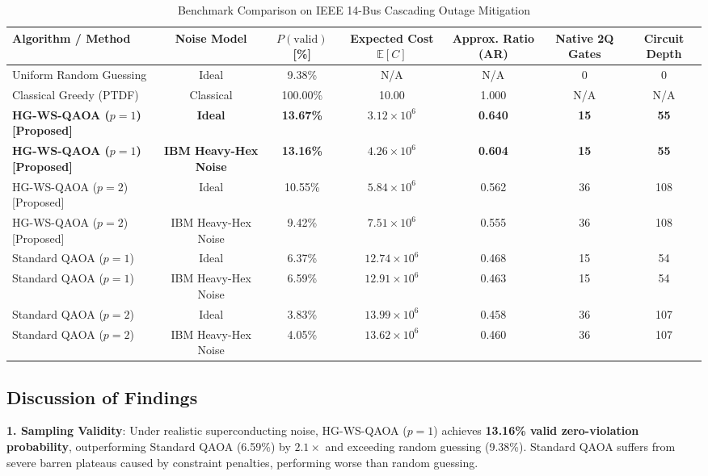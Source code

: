 \documentclass[conference]{IEEEtran}
\begin{document}
\begin{table}[t]
\caption{Benchmark Comparison on IEEE 14-Bus Cascading Outage Mitigation}
\label{tab:results}
\centering
\begin{tabular}{lcccccc}
\toprule
\textbf{Algorithm / Method} & \textbf{Noise Model} & \textbf{$P(\text{valid})$ [\%]} & \textbf{Expected Cost $\mathbb{E}[C]$} & \textbf{Approx. Ratio (AR)} & \textbf{Native 2Q Gates} & \textbf{Circuit Depth} \\
\midrule
Uniform Random Guessing & Ideal & 9.38\% & N/A & N/A & 0 & 0 \\
Classical Greedy (PTDF) & Classical & 100.00\% & 10.00 & 1.000 & N/A & N/A \\
\midrule
\textbf{HG-WS-QAOA ($p=1$) [Proposed]} & \textbf{Ideal} & \textbf{13.67\%} & \textbf{$3.12 \times 10^6$} & \textbf{0.640} & \textbf{15} & \textbf{55} \\
\textbf{HG-WS-QAOA ($p=1$) [Proposed]} & \textbf{IBM Heavy-Hex Noise} & \textbf{13.16\%} & \textbf{$4.26 \times 10^6$} & \textbf{0.604} & \textbf{15} & \textbf{55} \\
HG-WS-QAOA ($p=2$) [Proposed] & Ideal & 10.55\% & $5.84 \times 10^6$ & 0.562 & 36 & 108 \\
HG-WS-QAOA ($p=2$) [Proposed] & IBM Heavy-Hex Noise & 9.42\% & $7.51 \times 10^6$ & 0.555 & 36 & 108 \\
\midrule
Standard QAOA ($p=1$) & Ideal & 6.37\% & $12.74 \times 10^6$ & 0.468 & 15 & 54 \\
Standard QAOA ($p=1$) & IBM Heavy-Hex Noise & 6.59\% & $12.91 \times 10^6$ & 0.463 & 15 & 54 \\
Standard QAOA ($p=2$) & Ideal & 3.83\% & $13.99 \times 10^6$ & 0.458 & 36 & 107 \\
Standard QAOA ($p=2$) & IBM Heavy-Hex Noise & 4.05\% & $13.62 \times 10^6$ & 0.460 & 36 & 107 \\
\bottomrule
\end{tabular}
\end{table}

\subsection{Discussion of Findings}
\textbf{1. Sampling Validity}: Under realistic superconducting noise, HG-WS-QAOA ($p=1$) achieves \textbf{13.16\% valid zero-violation probability}, outperforming Standard QAOA (6.59\%) by \textbf{$2.1\times$} and exceeding random guessing (9.38\%). Standard QAOA suffers from severe barren plateaus caused by constraint penalties, performing worse than random guessing.
\end{document}
